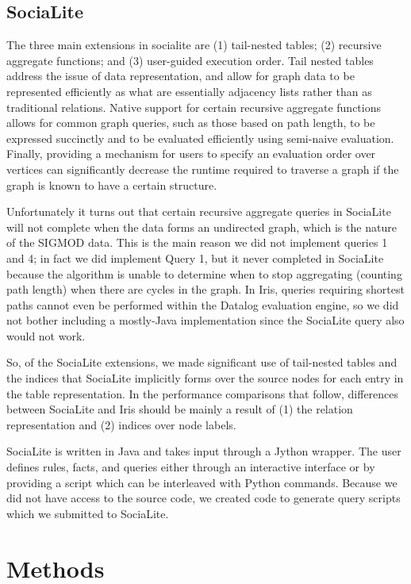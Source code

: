 \documentclass{article}
\begin{document}
\begin{multicols}{2}
\subsection{SociaLite}

The three main extensions in socialite are (1) tail-nested tables; (2) recursive aggregate functions; and (3) user-guided execution order. Tail nested tables address the issue of data representation, and allow for graph data to be represented efficiently as what are essentially adjacency lists rather than as traditional relations. Native support for certain recursive aggregate functions allows for common graph queries, such as those based on path length, to be expressed succinctly and to be evaluated efficiently using semi-naive evaluation. Finally, providing a mechanism for users to specify an evaluation order over vertices can significantly decrease the runtime required to traverse a graph if the graph is known to have a certain structure.

Unfortunately it turns out that certain recursive aggregate queries in SociaLite will not complete when the data forms an undirected graph, which is the nature of the SIGMOD data. This is the main reason we did not implement queries 1 and 4; in fact we did implement Query 1, but it never completed in SociaLite because the algorithm is unable to determine when to stop aggregating (counting path length) when there are cycles in the graph. In Iris, queries requiring shortest paths cannot even be performed within the Datalog evaluation engine, so we did not bother including a mostly-Java implementation since the SociaLite query also would not work.

So, of the SociaLite extensions, we made significant use of tail-nested tables and the indices that SociaLite implicitly forms over the source nodes for each entry in the table representation. In the performance comparisons that follow, differences between SociaLite and Iris should be mainly a result of (1) the relation representation and (2) indices over node labels. 

SociaLite is written in Java and takes input through a Jython wrapper. The user defines rules, facts, and queries either through an interactive interface or by providing a script which can be interleaved with Python commands. Because we did not have access to the source code, we created code to generate query scripts which we submitted to SociaLite. 

\section{Methods}


\end{multicols}
\end{document}
